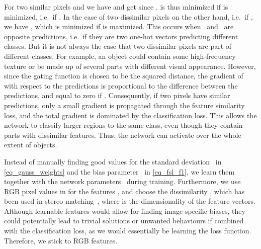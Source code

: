 \documentclass{article}
\begin{document}
For two similar pixels  and  we have  and get  since .  is thus minimized if  is minimized, i.e.~if . In the case of two dissimilar pixels on the other hand, i.e.~if , we have , which is minimized if  is maximized. This occurs when ~and~ are opposite predictions, i.e.~if they are two one-hot vectors predicting different classes. But it is not always the case that two dissimilar pixels are part of different classes. For example, an object could contain some high-frequency texture or be made up of several parts with different visual appearance. However, since the gating function is chosen to be the squared  distance, the gradient of  with respect to the predictions is proportional to the difference between the predictions, and equal to zero if . Consequently, if two pixels have similar predictions, only a small gradient is propagated through the feature similarity loss, and the total gradient is dominated by the classification loss. This allows the network to classify larger regions to the same class, even though they contain parts with dissimilar features. Thus, the network can activate over the whole extent of objects.

\iffalse
Consequently, if two pixels already have the same prediction, then no gradient is propagated through the feature similarity loss term, independent of the features. This allows the network to activate over the whole extent of objects, even though they contain parts with dissimilar features.

Consequently, if two pixels have similar predictions, only a small gradient is propagated through the feature similarity loss, and the total gradient is dominated by the classification loss. This allows the network to classify regions to the same class, even though they contain parts with dissimilar features. Thus it can activate over the whole extent of objects.
\fi

Instead of manually finding good values for the standard deviation~ in \eqref{eq_gauss_weights} and the bias parameter~ in \eqref{eq_fsl_f1}, we learn them together with the network parameters~ during training. Furthermore, we use RGB pixel values in  for the features , and choose the dissimilarity , which has been used in stereo matching~\cite{galar2013oe}, where  is the dimensionality of the feature vectors. Although learnable features would allow for finding image-specific biases, they could potentially lead to trivial solutions or unwanted behaviours if combined with the classification loss, as we would essentially be learning the loss function. Therefore, we stick to RGB features.
\end{document}
